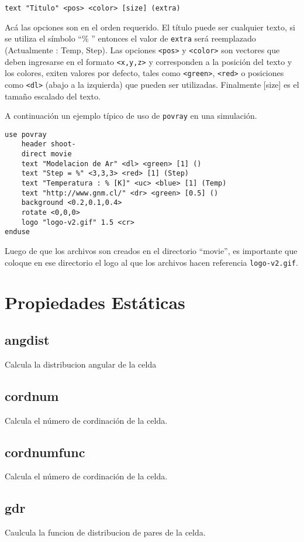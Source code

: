 \documentclass[a4paper,10pt]{scrbook}
\newcommand{\control}[1]{\begin{center}\begin{minipage}{10cm}\texttt{#1}\end{minipage}\end{center}}
\begin{document}
\control{text "Titulo" <pos> <color> [size] (extra)}

Ac\'a las opciones son en el orden requerido. El t\'itulo puede ser cualquier texto, si se utiliza el s\'imbolo ``\% '' entonces el valor de \verb|extra| ser\'a reemplazado (Actualmente : Temp, Step). Las opciones \verb|<pos>| y \verb|<color>| son vectores que deben ingresarse en el formato \verb|<x,y,z>| y corresponden a la posici\'on del texto y los colores, exiten valores por defecto, tales como \verb|<green>|, \verb|<red>| o posiciones como \verb|<dl>| (abajo a la izquierda) que pueden ser utilizadas. Finalmente [size] es el tama\~no escalado del texto.

A continuaci\'on un ejemplo t\'ipico de uso de \verb|povray| en una simulaci\'on.

\begin{verbatim}
use povray
    header shoot-
    direct movie
    text "Modelacion de Ar" <dl> <green> [1] ()
    text "Step = %" <3,3,3> <red> [1] (Step)
    text "Temperatura : % [K]" <uc> <blue> [1] (Temp)
    text "http://www.gnm.cl/" <dr> <green> [0.5] ()
    background <0.2,0.1,0.4>
    rotate <0,0,0>
    logo "logo-v2.gif" 1.5 <cr>
enduse
\end{verbatim}

Luego de que los archivos son creados en el directorio ``movie'', es importante que coloque en ese directorio el logo al que los archivos hacen referencia \verb|logo-v2.gif|.

\section{Propiedades Est\'aticas}
\subsection{angdist}
Calcula la distribucion angular de la celda
\subsection{cordnum}
Calcula el n\'umero de cordinaci\'on de la celda.
\subsection{cordnumfunc}
Calcula el n\'umero de cordinaci\'on de la celda.
\subsection{gdr}
Caulcula la funcion de distribucion de pares de la celda.
\end{document}
